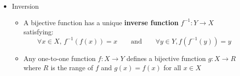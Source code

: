 \documentclass[11pt,twoside]{report}
\begin{document}
\begin{itemize}
\item Inversion 
\begin{itemize}
  \item A bijective function has a unique \textbf{inverse function} $f^{-1} \colon Y\rightarrow X$ satisfying: 
  \[
  \forall x\in X,\,  f^{-1}(f(x)) = x \qquad \text{and} \qquad \forall y\in Y, f(f^{-1}(y)) = y
  \]
  \item Any one-to-one function $f \colon X\rightarrow Y$ defines a bijective function $g \colon X \rightarrow R$ where $R$ is the range of $f$ and $g(x)=f(x)$ for all $x\in X$
 \end{itemize}
 
 
 \end{itemize}
 
\end{document}

